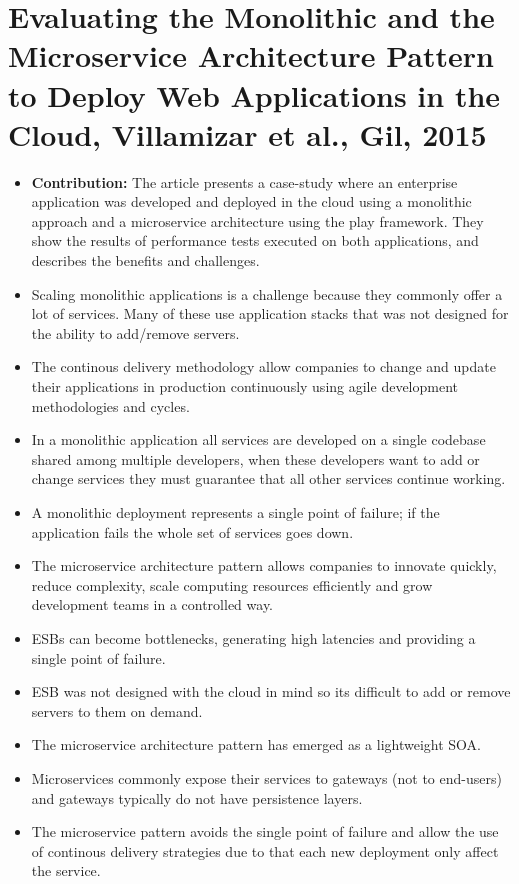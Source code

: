 \section{Evaluating the Monolithic and the Microservice Architecture Pattern to Deploy Web Applications in the Cloud, Villamizar et al., Gil, 2015}

\begin{itemize}
  \item \textbf{Contribution: } The article presents a case-study where an enterprise application was developed and deployed in the cloud using a monolithic approach and a microservice architecture using the play framework. They show the results of performance tests executed on both applications, and describes the benefits and challenges.
  \item Scaling monolithic applications is a challenge because they commonly offer a lot of services. Many of these use application stacks that was not designed for the ability to add/remove servers.
  \item The continous delivery methodology allow companies to change and update their applications in production continuously using agile development methodologies and cycles.
  \item In a monolithic application all services are developed on a single codebase shared among multiple developers, when these developers want to add or change services they must guarantee that all other services continue working.
  \item A monolithic deployment represents a single point of failure; if the application fails the whole set of services goes down.
  \item The microservice architecture pattern allows companies to innovate quickly, reduce complexity, scale computing resources efficiently and grow development teams in a controlled way.
  \item ESBs can become bottlenecks, generating high latencies and providing a single point of failure.
  \item ESB was not designed with the cloud in mind so its difficult to add or remove servers to them on demand.
  \item The microservice architecture pattern has emerged as a lightweight SOA.
  \item Microservices commonly expose their services to gateways (not to end-users) and gateways typically do not have persistence layers.
  \item The microservice pattern avoids the single point of failure and allow the use of continous delivery strategies due to that each new deployment only affect the service.

\end{itemize}
